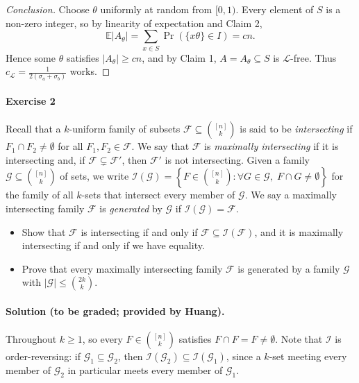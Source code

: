 \documentclass[a4paper,12pt]{article}
\newcommand{\card}[1]{\left| #1 \right|}
\newcommand{\mb}[1]{\mathbb{#1}}
\newcommand{\mc}[1]{\mathcal{#1}}
\begin{document}
\begin{proof}[Conclusion]
	Choose $\theta$ uniformly at random from $[0,1)$. Every element of $S$ is a non-zero integer, so by linearity of expectation and Claim 2,
	\[
		\mb E \card{A_\theta} = \sum_{x \in S} \Pr(\{x\theta\} \in I) = cn.
	\]
	Hence some $\theta$ satisfies $\card{A_\theta} \ge cn$, and by Claim 1, $A = A_\theta \subseteq S$ is $\mc L$-free. Thus $c_{\mc L} = \frac{1}{2(\sigma_a + \sigma_b)}$ works.
\end{proof}

\paragraph{Exercise 2}  Recall that a $k$-uniform family of subsets $\mc F \subseteq \binom{[n]}{k}$ is said to be \emph{intersecting} if $F_1 \cap F_2 \neq \emptyset$ for all $F_1, F_2 \in \mc F$. We say that $\mc F$ is \emph{maximally intersecting} if it is intersecting and, if $\mc F \subsetneq \mc F'$, then $\mc F'$ is not intersecting. Given a family $\mc G \subseteq \binom{[n]}{k}$ of sets, we write $\mc I(\mc G) = \left\{ F \in \binom{[n]}{k}: \forall G \in \mc G, \; F \cap G \neq \emptyset \right\}$ for the family of all $k$-sets that intersect every member of $\mc G$. We say a maximally intersecting family $\mc F$ is \emph{generated} by $\mc G$ if $\mc I(\mc G) = \mc F$.

\begin{itemize}
	\item[(a)] Show that $\mc F$ is intersecting if and only if $\mc F \subseteq \mc I( \mc F)$, and it is maximally intersecting if and only if we have equality.
	\item[(b)] Prove that every maximally intersecting family $\mc F$ is generated by a family $\mc G$ with $\card{\mc G} \le \binom{2k}{k}$.
\end{itemize}

\paragraph{Solution (to be graded; provided by Huang).} Throughout $k \ge 1$, so every $F \in \binom{[n]}{k}$ satisfies $F \cap F = F \neq \emptyset$. Note that $\mc I$ is order-reversing: if $\mc G_1 \subseteq \mc G_2$, then $\mc I(\mc G_2) \subseteq \mc I(\mc G_1)$, since a $k$-set meeting every member of $\mc G_2$ in particular meets every member of $\mc G_1$.
\end{document}
